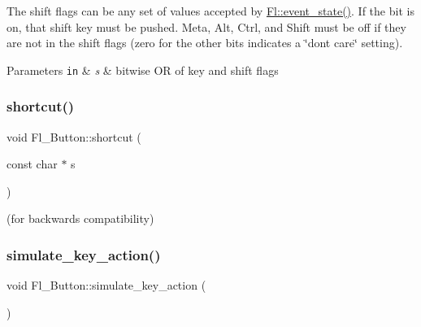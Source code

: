 The shift flags can be any set of values accepted by \hyperlink{group__fl__events_gafa17a5b4d8d9163631c88142e60447ed}{Fl\+::event\+\_\+state()}. If the bit is on, that shift key must be pushed. Meta, Alt, Ctrl, and Shift must be off if they are not in the shift flags (zero for the other bits indicates a \char`\"{}don\textquotesingle{}t care\char`\"{} setting). 
\begin{DoxyParams}[1]{Parameters}
\mbox{\tt in}  & {\em s} & bitwise OR of key and shift flags \\
\hline
\end{DoxyParams}
\mbox{\label{class_fl___button_a3b8d2f683517cffe1c9b55dc7271a0d1}} 
\subsubsection{\texorpdfstring{shortcut()}{shortcut()}\hspace{0.1cm}{\footnotesize\ttfamily [3/3]}}
{\footnotesize\ttfamily void Fl\+\_\+\+Button\+::shortcut (\begin{DoxyParamCaption}\item[{const char $\ast$}]{s }\end{DoxyParamCaption})\hspace{0.3cm}{\ttfamily [inline]}}



(for backwards compatibility) 

\mbox{\label{class_fl___button_a9c09299acdca97e128d6cf2e8fe0a469}} 
\subsubsection{\texorpdfstring{simulate\+\_\+key\+\_\+action()}{simulate\_key\_action()}}
{\footnotesize\ttfamily void Fl\+\_\+\+Button\+::simulate\+\_\+key\+\_\+action (\begin{DoxyParamCaption}{ }\end{DoxyParamCaption})\hspace{0.3cm}{\ttfamily [protected]}}

\mbox{\label{class_fl___button_aceffc03f6b14f180a1639e26c91f9a4a}} 

